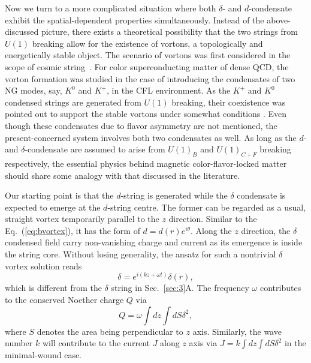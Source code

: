 \documentclass[12pt]{article}
\begin{document}
Now we turn to a more complicated situation where both $\delta$- and $d$-condensate exhibit the
spatial-dependent properties simultaneously. Instead of the above-discussed picture, there exists a
theoretical possibility that the two strings from $U(1)$ breaking allow for the existence of vortons,
a topologically and energetically stable object. The scenario of vortons was first considered in the
scope of cosmic
string~\cite{vilenkin2000cosmic,witten1985superconducting,davis1988physics1,davis1988physics2,haws1988superconducting}.
For color superconducting matter of dense QCD, the vorton formation was studied in the case of introducing the
condensates of two NG modes, say, $K^0$ and $K^+$, in the CFL environment. As the $K^+$ and $K^0$ condensed strings are generated from $U(1)$ breaking, their coexistence was pointed out to support the stable vortons under somewhat conditions \cite{kaplan2002charged,buckley2002superconducting}. 
Even though these condensates due to flavor asymmetry are not mentioned, the present-concerned system involves both two condensates as well. As long as the $d$- and
$\delta$-condensate are assumed to arise from $U(1)_B$ and $U(1)_{C+F}$ breaking respectively, the essential physics
behind magnetic color-flavor-locked matter should share some analogy with that discussed in the literature.
%

Our starting point is that the $d$-string is generated while the $\delta$ condensate is expected to emerge
at the $d$-string centre. The former can be regarded as a usual, straight vortex temporarily parallel to the
$z$ direction. Similar to the Eq.~(\ref{eq:bvortex}), it has the form of $d = d(r)e^{i\theta}$.
Along the $z$ direction, the $\delta$ condensed field carry non-vanishing charge and current as its emergence
is inside the string core. Without losing generality, the ansatz for such a nontrivial $\delta$ vortex solution reads
\begin{equation}
  \label{eq:delta}
  \delta =  e^{i(kz+\omega t)}\delta(r),
\end{equation}
which is different from the $\delta$ string in Sec.~\ref{sec:3}A. The frequency $\omega$ contributes to the conserved
Noether charge $Q$ via
 \begin{equation}
  \label{eq:vortonquantumq}
   Q = \omega\int dz \int dS \delta^2,
 \end{equation}
where $S$ denotes the area being perpendicular to $z$ axis. Similarly, the wave number $k$ will contribute to the
current $J$ along $z$ axis via $J =k\int dz \int dS \delta^2$ in the minimal-wound case.
\end{document}
